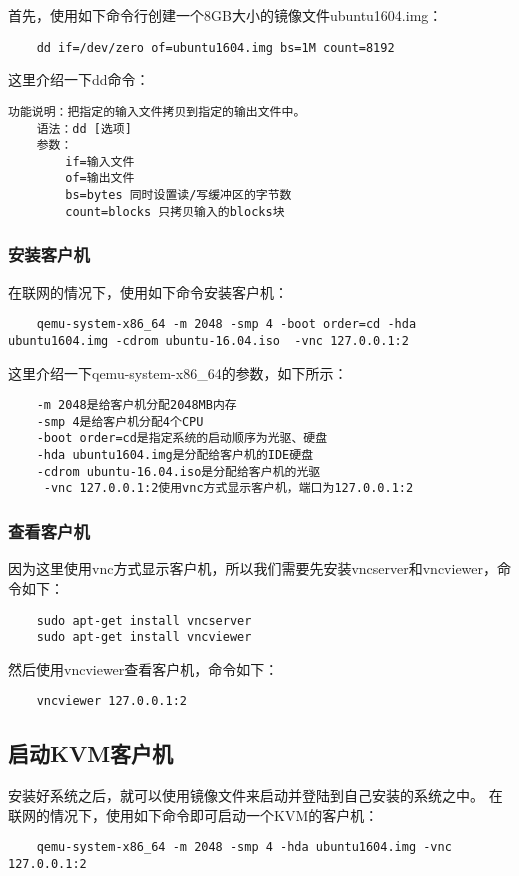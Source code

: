 \documentclass[a4paper,left=2.5cm,right=2.5cm,11pt]{article}
\begin{document}
	首先，使用如下命令行创建一个8GB大小的镜像文件ubuntu1604.img：
	\begin{lstlisting}
	dd if=/dev/zero of=ubuntu1604.img bs=1M count=8192
	\end{lstlisting}

	这里介绍一下dd命令：
	\begin{lstlisting}[numberstyle = \color{white}]
	功能说明：把指定的输入文件拷贝到指定的输出文件中。
	语法：dd [选项]
	参数：
		if=输入文件
		of=输出文件
		bs=bytes 同时设置读/写缓冲区的字节数
		count=blocks 只拷贝输入的blocks块
	\end{lstlisting}

\subsubsection{安装客户机}
	在联网的情况下，使用如下命令安装客户机：
	\begin{lstlisting}
	qemu-system-x86_64 -m 2048 -smp 4 -boot order=cd -hda ubuntu1604.img -cdrom ubuntu-16.04.iso  -vnc 127.0.0.1:2
	\end{lstlisting}

	这里介绍一下qemu-system-x86\_64的参数，如下所示：
	\begin{lstlisting}
	-m 2048是给客户机分配2048MB内存
	-smp 4是给客户机分配4个CPU
	-boot order=cd是指定系统的启动顺序为光驱、硬盘
	-hda ubuntu1604.img是分配给客户机的IDE硬盘
	-cdrom ubuntu-16.04.iso是分配给客户机的光驱
	 -vnc 127.0.0.1:2使用vnc方式显示客户机，端口为127.0.0.1:2
	\end{lstlisting}

\subsubsection{查看客户机}
	因为这里使用vnc方式显示客户机，所以我们需要先安装vncserver和vncviewer，命令如下：
	\begin{lstlisting}
	sudo apt-get install vncserver
	sudo apt-get install vncviewer
	\end{lstlisting}

	然后使用vncviewer查看客户机，命令如下：
	\begin{lstlisting}
	vncviewer 127.0.0.1:2
	\end{lstlisting}

\subsection{启动KVM客户机}
	安装好系统之后，就可以使用镜像文件来启动并登陆到自己安装的系统之中。
	在联网的情况下，使用如下命令即可启动一个KVM的客户机：
	\begin{lstlisting}
	qemu-system-x86_64 -m 2048 -smp 4 -hda ubuntu1604.img -vnc 127.0.0.1:2
	\end{lstlisting}
\end{document}
